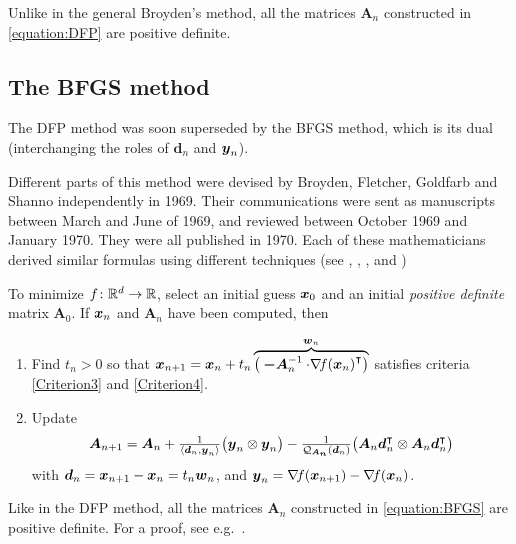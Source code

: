 \begin{remark}
Unlike in the general Broyden's method, all the matrices $\boldsymbol{A}_n$ constructed in \eqref{equation:DFP} are positive definite. 
\end{remark}

\subsection{The BFGS method}
The DFP method was soon superseded by the BFGS method, which is its dual (interchanging the roles of $\boldsymbol{d}_n$ and $\boldsymbol{y}_n$).

Different parts of this method were devised by Broyden, Fletcher, Goldfarb and Shanno independently in 1969.  Their communications were sent as manuscripts between March and June of 1969, and reviewed between October 1969 and January 1970.  They were all published in 1970.  Each of these mathematicians derived similar formulas using different techniques (see \cite{broyden1970convergence}, \cite{fletcher1970new}, \cite{goldfarb1970family}, \cite{shanno1970conditioning} and \cite{shanno1970optimal})

To minimize $f \colon \mathbb{R}^d \to \mathbb{R}$, select an initial guess $\boldsymbol{x}_0$ and an initial \emph{positive definite} matrix $\boldsymbol{A}_0$.  If $\boldsymbol{x}_n$ and $\boldsymbol{A}_n$ have been computed, then
\begin{enumerate}
	\item Find $t_n>0$ so that $\boldsymbol{x}_{n+1} = \boldsymbol{x}_n + t_n \overbrace{\big( \boldsymbol{-A}_n^{-1} \cdot {\mathop{\nabla\! {f}}(\boldsymbol{x}_n)}^\intercal\big)}^{\boldsymbol{w}_n}$ satisfies criteria \eqref{Criterion3} and \eqref{Criterion4}.
	\item Update
	\begin{equation}\label{equation:BFGS}
	\boldsymbol{A}_{n+1} = \boldsymbol{A}_n + \tfrac{1}{\langle \boldsymbol{d}_n, \boldsymbol{y}_n \rangle } \big( \boldsymbol{y}_n \otimes \boldsymbol{y}_n \big) - \tfrac{1}{\mathcal{Q}_{\boldsymbol{A_n}} (\boldsymbol{d}_n) } \big( \boldsymbol{A}_n {\boldsymbol{d}}^\intercal_n \otimes \boldsymbol{A}_n {\boldsymbol{d}}^\intercal_n \big)
	\end{equation}
	with $\boldsymbol{d}_n = \boldsymbol{x}_{n+1}-\boldsymbol{x}_n= t_n\boldsymbol{w}_n$, and $\boldsymbol{y}_n = \mathop{\nabla\! {f}}(\boldsymbol{x}_{n+1}) - \mathop{\nabla\! {f}}(\boldsymbol{x}_n)$.
\end{enumerate}

\begin{remark}
Like in the DFP method, all the matrices $\boldsymbol{A}_n$ constructed in \eqref{equation:BFGS} are positive definite.  For a proof, see e.g.~\cite[Theorem 3.5.2]{peressini1988mathematics}.
\end{remark}

